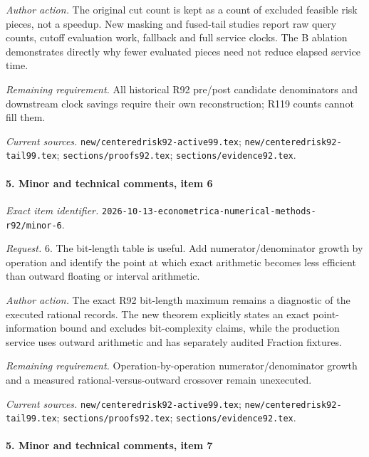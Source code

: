 \par\emph{Author action.} The original cut count is kept as a count of excluded feasible risk pieces, not a speedup. New masking and fused-tail studies report raw query counts, cutoff evaluation work, fallback and full service clocks. The B ablation demonstrates directly why fewer evaluated pieces need not reduce elapsed service time.

\par\emph{Remaining requirement.} All historical R92 pre/\allowbreak{}post candidate denominators and downstream clock savings require their own reconstruction; R119 counts cannot fill them.

\par\emph{Current sources.} \nolinkurl{new/centeredrisk92-active99.tex}; \nolinkurl{new/centeredrisk92-tail99.tex}; \nolinkurl{sections/proofs92.tex}; \nolinkurl{sections/evidence92.tex}.

\paragraph{5. Minor and technical comments, item 6}

\emph{Exact item identifier.} \nolinkurl{2026-10-13-econometrica-numerical-methods-r92/minor-6}.

\par\emph{Request.} 6. The bit-length table is useful. Add numerator/\allowbreak{}denominator growth by operation and identify the point at which exact arithmetic becomes less efficient than outward floating or interval arithmetic.

\par\emph{Author action.} The exact R92 bit-length maximum remains a diagnostic of the executed rational records. The new theorem explicitly states an exact point-information bound and excludes bit-complexity claims, while the production service uses outward arithmetic and has separately audited Fraction fixtures.

\par\emph{Remaining requirement.} Operation-by-operation numerator/\allowbreak{}denominator growth and a measured rational-versus-outward crossover remain unexecuted.

\par\emph{Current sources.} \nolinkurl{new/centeredrisk92-active99.tex}; \nolinkurl{new/centeredrisk92-tail99.tex}; \nolinkurl{sections/proofs92.tex}; \nolinkurl{sections/evidence92.tex}.

\paragraph{5. Minor and technical comments, item 7}

